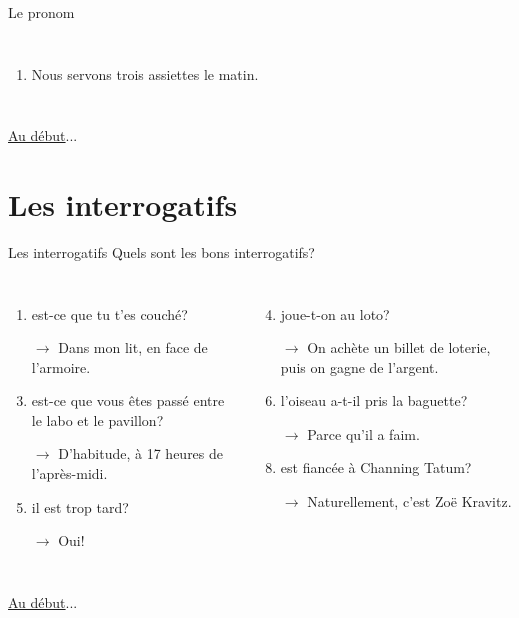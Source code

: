\documentclass{beamer}
\begin{document}
\begin{frame}{Le pronom }
\begin{columns}[t]
\begin{enumerate}
            \item Nous \underline{  } servons \underline{\hspace{0.35cm}} trois \underline{\hspace{0.35cm}} assiettes \underline{\hspace{0.35cm}} le matin.
          \end{enumerate}
      \end{columns}
      \vspace{0.5cm}
      \hyperlink{début}{Au début}...
    \end{frame}

  \section{Les interrogatifs}
    \begin{frame}{Les interrogatifs}
      Quels sont les bons interrogatifs?
      \begin{columns}[t]
          \begin{enumerate}
            \item \underline{} est-ce que tu t'es couché?
            \item[$\to$] Dans mon lit, en face de l'armoire.
            \item \underline{} est-ce que vous êtes passé entre le labo et le pavillon?
            \item[$\to$] D'habitude, à 17 heures de l'après-midi.
            \item \underline{}il est trop tard?
            \item[$\to$] Oui!
          \end{enumerate}
          \begin{enumerate}
            \setcounter{enumi}{3}
            \item \underline{} joue-t-on au loto?
            \item[$\to$] On achète un billet de loterie, puis on gagne de l'argent.
            \item \underline{} l'oiseau a-t-il pris la baguette?
            \item[$\to$] Parce qu'il a faim.
            \item \underline{} est fiancée à Channing Tatum?
            \item[$\to$] Naturellement, c'est Zoë Kravitz.
          \end{enumerate}
      \end{columns}
      \vspace{0.5cm}
      \hyperlink{début}{Au début}...
    \end{frame}
\end{document}
